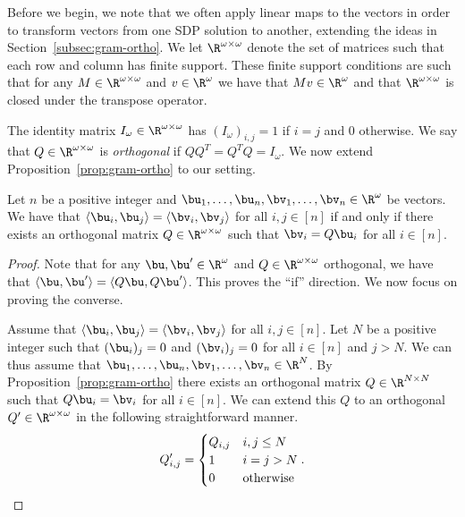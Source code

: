 {Before we begin, we note that we often apply linear maps to the vectors in order to transform vectors from one SDP solution to another, extending the ideas in Section~\ref{subsec:gram-ortho}. We let $\R^{\omega \times \omega}$ denote the set of matrices such that each row and column has finite support. These finite support conditions are such that for any $M \in \R^{\omega \times \omega}$ and $v \in \R^{\omega}$ we have that $Mv \in \R^{\omega}$ and that $\R^{\omega \times \omega}$ is closed under the transpose operator.}

{The identity matrix $I_{\omega} \in \R^{\omega \times \omega}$ has $(I_{\omega})_{i,j} = 1$ if $i = j$ and $0$ otherwise. We say that $Q \in \R^{\omega \times \omega}$ is \emph{orthogonal} if $Q Q^{T} = Q^T Q = I_{\omega}.$ We now extend Proposition~\ref{prop:gram-ortho} to our setting.}

{\begin{proposition}\label{prop:ortho}
Let $n$ be a positive integer and $\bu_1, \hdots, \bu_n, \bv_1, \hdots, \bv_n \in \R^{\omega}$ be vectors. We have that $\langle \bu_i, \bu_j \rangle = \langle \bv_i, \bv_j\rangle$ for all $i,j \in [n]$ if and only if there exists an orthogonal matrix $Q \in \R^{\omega \times \omega}$ such that $\bv_i = Q \bu_i$ for all $i \in [n]$. 
\end{proposition}
\begin{proof}
Note that for any $\bu, \bu' \in \R^{\omega}$ and $Q \in \R^{\omega \times \omega}$ orthogonal, we have that $\langle \bu, \bu'\rangle = \langle Q\bu, Q\bu' \rangle$. This proves the ``if'' direction. We now focus on proving the converse.

Assume that $\langle\bu_i, \bu_j\rangle = \langle \bv_i, \bv_j\rangle$ for all $i,j \in [n]$. Let $N$ be a positive integer such that $(\bu_i)_j = 0$ and $(\bv_i)_j = 0$ for all $i \in [n]$ and $j > N$. We can thus assume that $\bu_1, \hdots, \bu_n, \bv_1, \hdots, \bv_n \in \R^N$. By Proposition~\ref{prop:gram-ortho} there exists an orthogonal matrix $Q \in \R^{N \times N}$ such that $Q\bu_i = \bv_i$ for all $i \in [n]$. We can extend this $Q$ to an orthogonal $Q' \in \R^{\omega \times \omega}$ in the following straightforward manner.
\[
    Q'_{i,j} = \begin{cases}
    Q_{i,j} & i, j \le N\\
    1 & i = j > N\\
    0 & \text{otherwise}
    \end{cases}.\qedhere
\]
\end{proof}
}

